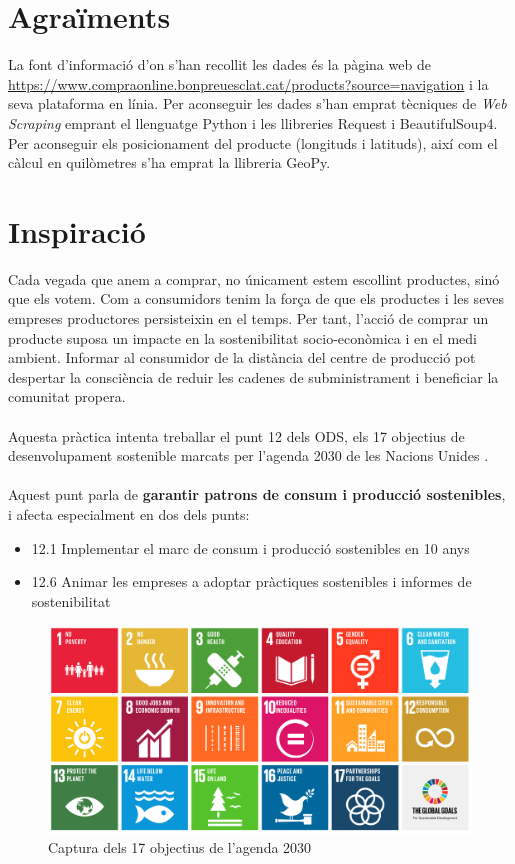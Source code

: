 \documentclass[]{scrartcl}
\begin{document}
\section{Agraïments}
La font d'informació d'on s'han recollit les dades és la pàgina web de \url{https://www.compraonline.bonpreuesclat.cat/products?source=navigation} i la seva plataforma en línia.  
Per aconseguir les dades s'han emprat tècniques de \textit{Web Scraping} emprant el llenguatge Python i les llibreries Request i BeautifulSoup4. Per aconseguir els posicionament del producte (longituds i latituds), així com el càlcul en quilòmetres s'ha emprat la llibreria GeoPy.


\section{Inspiració}
Cada vegada que anem a comprar, no únicament estem escollint productes, sinó que els votem. Com a consumidors tenim la força de que els productes i les seves empreses productores persisteixin en el temps. Per tant, l'acció de comprar un producte suposa un impacte en la sostenibilitat socio-econòmica i en el medi ambient. Informar al consumidor de la distància del centre de producció pot despertar la consciència de reduir les  cadenes de subministrament i beneficiar la comunitat propera.
\\\\
Aquesta pràctica intenta treballar el punt 12 dels ODS, els 17 objectius de desenvolupament sostenible marcats per l'agenda 2030 de les Nacions Unides \cite{nu01}.
\\\\
Aquest punt parla de \textbf{garantir patrons de consum i producció sostenibles}, i afecta especialment en dos dels punts:
\begin{itemize}
	\item 12.1 Implementar el marc de consum i producció sostenibles en 10 anys
	\item 12.6 Animar les empreses a adoptar pràctiques sostenibles i informes de sostenibilitat
\end{itemize} 
\begin{figure}[!h]
	\centering
	\includegraphics[width=\linewidth]{../img/infographic_cc_globalgoals2030}
	\caption{Captura dels 17 objectius de l'agenda 2030}
\end{figure}
\end{document}
